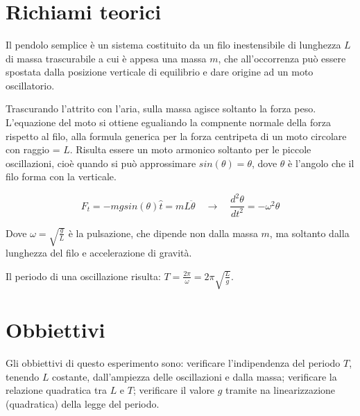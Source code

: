 \documentclass[12pt, a4paper]{article}
\title{\textbf{\scalebox{1.4}{\text{{\Huge Pendolo}}}}}
\date{}
\begin{document}
\maketitle
{}%


\section{Richiami teorici}
Il pendolo semplice è un sistema costituito da un filo inestensibile di lunghezza $L$ di massa trascurabile a cui è appesa una massa $m$, che all'occorrenza può essere spostata dalla posizione verticale di equilibrio e dare origine ad un moto oscillatorio. 

Trascurando l'attrito con l'aria, sulla massa agisce soltanto la forza peso. 
L'equazione del moto si ottiene egualiando la compnente normale della forza rispetto al filo, alla formula generica per la forza centripeta di un moto circolare con raggio = $L$.
Risulta essere un moto armonico soltanto per le piccole oscillazioni, cioè quando si può approssimare $sin(\theta) = \theta$, dove $\theta$ è l'angolo che il filo forma con la verticale. 

\begin{equation}
        F_t = -mg sin(\theta)\hat{t} = mL\ddot{\theta}   \quad \xrightarrow{} \quad   \frac{d^2\theta}{dt^2} = -\omega^2\theta 
\end{equation}

Dove $\omega = \sqrt{\frac{g}{L}}$ è la pulsazione, che dipende non dalla massa $m$, ma soltanto dalla lunghezza del filo e accelerazione di gravità. 

Il periodo di una oscillazione risulta: $T = \frac{2\pi}{\omega} = 2\pi\sqrt{\frac{L}{g}}$.





\section{Obbiettivi}
Gli obbiettivi di questo esperimento sono: 
verificare l'indipendenza del periodo $T$, tenendo $L$ costante, dall'ampiezza delle oscillazioni e dalla massa;
verificare la relazione quadratica tra $L$ e $T$; 
verificare il valore $g$ tramite na linearizzazione (quadratica) della legge del periodo.
\end{document}
